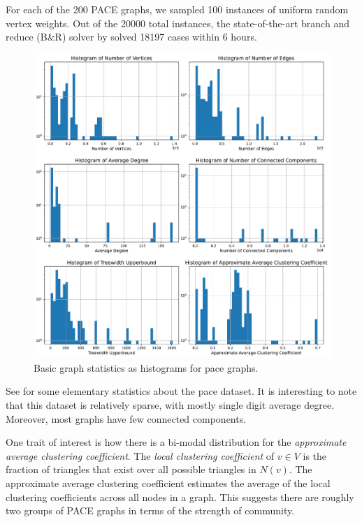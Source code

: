 \documentclass{article}
\begin{document}
For each of the 200 PACE graphs,
we sampled 100 instances of uniform random vertex weights.
Out of the 20000 total instances,  
the state-of-the-art branch and reduce (B\&R) solver by \citet{kamis} solved 18197 cases within 6 hours.

\begin{figure}
     \centering
     \includegraphics[width=\textwidth]{figures/pace_unweighted}
     \caption{Basic graph statistics as histograms for pace graphs.}
     \label{fig:pace_unweighted}
\end{figure}

See  for some elementary statistics about the pace dataset.
It is interesting to note that this dataset is relatively sparse,
with mostly single digit average degree.
Moreover, most graphs have few connected components.

One trait of interest is how there is a bi-modal distribution for the \emph{approximate average clustering coefficient}.
The \emph{local clustering coefficient} of $v\in V$
is the fraction of triangles that exist over all possible triangles in $N(v)$.
The approximate average clustering coefficient
estimates the average of the local clustering coefficients across all nodes in a graph.
This suggests there are roughly two groups of PACE graphs in terms of the strength of community.
\end{document}
